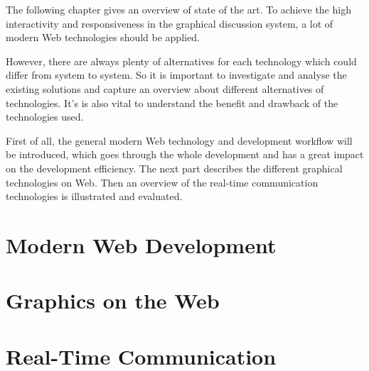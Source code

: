 The following chapter gives an overview of state of the art. To achieve the high interactivity and responsiveness in the graphical discussion system, a lot of modern Web technologies should be applied.

However, there are always plenty of alternatives for each technology which could differ from system to system. So it is important to investigate and analyse the existing solutions and capture an overview about different alternatives of technologies. It's is also vital to understand the benefit and drawback of the technologies used.

First of all, the general modern Web technology and development workflow will be introduced, which goes through the whole development and has a great impact on the development efficiency. The next part describes the different graphical technologies on Web. Then an overview of the real-time communication technologies is illustrated and evaluated.

\section{Modern Web Development}

\section{Graphics on the Web}
 \label{graphics-section}
\section{Real-Time Communication}

% 
% 


